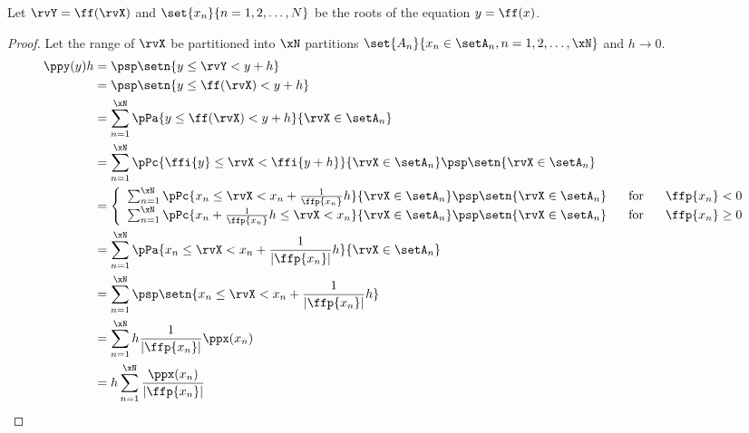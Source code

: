 \begin{theorem}
\label{thm:Y=f(X)}
Let $\rvY=\ff(\rvX)$ and $\set{x_n}{n=1,2,\ldots,N}$ be the roots of the equation
$y=\ff(x)$.
\end{theorem}
\begin{proof}
Let the range of $\rvX$ be partitioned into $\xN$ partitions
$\set{A_n}{x_n\in\setA_n, n=1,2,\ldots,\xN}$ and $h\to0$.
\begin{align*}
  \ppy(y)h
    &= \psp\setn{y \le\rvY < y+h}
  \\&= \psp\setn{y \le \ff(\rvX) < y+h}
  \\&= \sum_{n=1}^{\xN} \pPa{y \le \ff(\rvX) < y+h}{\rvX\in\setA_n}
  \\&= \sum_{n=1}^{\xN} \pPc{\ffi{y} \le\rvX < \ffi{y+h}}{\rvX\in\setA_n}\psp\setn{\rvX\in\setA_n}
  \\&= \left\{\begin{array}{l@{\hspace{4ex}\mbox{for}\hspace{4ex}}l}
         \sum_{n=1}^{\xN} \pPc{x_n     \le\rvX < x_n + \frac{1}{\ffp{x_n}}h}{\rvX\in\setA_n}\psp\setn{\rvX\in\setA_n} & \ffp{x_n}<0 \\
         \sum_{n=1}^{\xN} \pPc{x_n + \frac{1}{\ffp{x_n}}h \le\rvX < x_n}{\rvX\in\setA_n}\psp\setn{\rvX\in\setA_n}     & \ffp{x_n}\ge0
       \end{array}\right.
  \\&= \sum_{n=1}^{\xN} \pPa{x_n     \le\rvX < x_n + \frac{1}{|\ffp{x_n}|}h}{\rvX\in\setA_n}
  \\&= \sum_{n=1}^{\xN} \psp\setn{x_n     \le\rvX < x_n + \frac{1}{|\ffp{x_n}|}h}
  \\&= \sum_{n=1}^{\xN} h \frac{1}{|\ffp{x_n}|} \ppx(x_n)
  \\&= h \sum_{n=1}^{\xN} \frac{\ppx(x_n)}{|\ffp{x_n}|}
\end{align*}
\end{proof}

